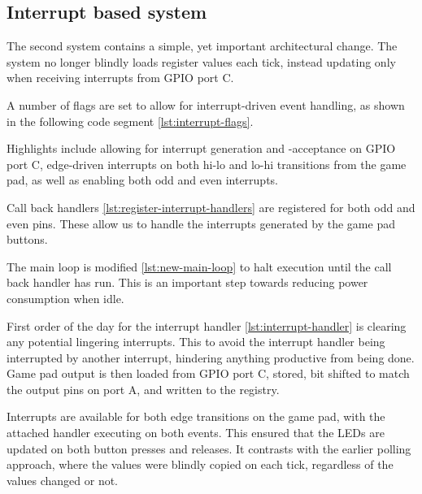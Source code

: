 \subsection{Interrupt based system}

The second system contains a simple, yet important architectural change. The system no longer blindly loads register values each tick, instead updating only when receiving interrupts from GPIO port C.

A number of flags are set to allow for interrupt-driven event handling, as shown in the following code segment \ref{lst:interrupt-flags}.

Highlights include allowing for interrupt generation and -acceptance on GPIO port C, edge-driven interrupts on both hi-lo and lo-hi transitions from the game pad, as well as enabling both odd and even interrupts.



Call back handlers \ref{lst:register-interrupt-handlers} are registered for both odd and even pins. These allow us to handle the interrupts generated by the game pad buttons.



The main loop is modified \ref{lst:new-main-loop} to halt execution until the call back handler has run. This is an important step towards reducing power consumption when idle.



First order of the day for the interrupt handler \ref{lst:interrupt-handler} is clearing any potential lingering interrupts. This to avoid the interrupt handler being interrupted by another interrupt, hindering anything productive from being done.
Game pad output is then loaded from GPIO port C, stored, bit shifted to match the output pins on port A, and written to the registry.

Interrupts are available for both edge transitions on the game pad, with the attached handler executing on both events.
This ensured that the LEDs are updated on both button presses and releases. It contrasts with the earlier polling approach, where the values were blindly copied on each tick, regardless of the values changed or not.

